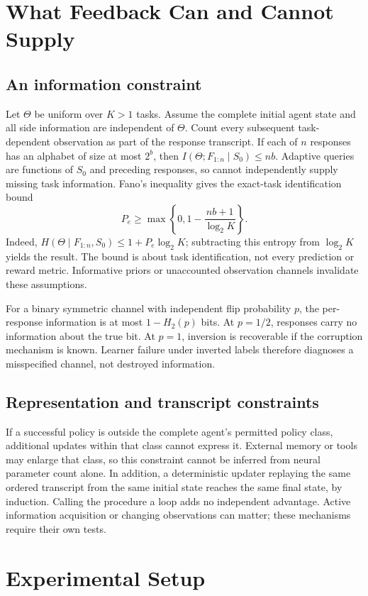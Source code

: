 \documentclass[11pt]{article}
\begin{document}
\section{What Feedback Can and Cannot Supply}
\subsection{An information constraint}
Let $\Theta$ be uniform over $K>1$ tasks. Assume the complete initial agent
state and all side information are independent of $\Theta$. Count every
subsequent task-dependent observation as part of the response transcript.
If each of $n$ responses has an alphabet of size at most $2^b$, then
$I(\Theta;F_{1:n}\mid S_0)\leq nb$. Adaptive queries are functions of
$S_0$ and preceding responses, so cannot independently supply missing task
information. Fano's inequality gives the exact-task identification bound
\[
 P_e\geq \max\left\{0,1-\frac{nb+1}{\log_2 K}\right\}.
\]
Indeed, $H(\Theta\mid F_{1:n},S_0)\leq 1+P_e\log_2 K$; subtracting
this entropy from $\log_2 K$ yields the result. The bound is about task
identification, not every prediction or reward metric. Informative priors or
unaccounted observation channels invalidate these assumptions.

For a binary symmetric channel with independent flip probability $p$, the
per-response information is at most $1-H_2(p)$ bits. At $p=1/2$, responses
carry no information about the true bit. At $p=1$, inversion is recoverable
if the corruption mechanism is known. Learner failure under inverted labels
therefore diagnoses a misspecified channel, not destroyed information.

\subsection{Representation and transcript constraints}
If a successful policy is outside the complete agent's permitted policy class,
additional updates within that class cannot express it. External memory or
tools may enlarge that class, so this constraint cannot be inferred from
neural parameter count alone. In addition, a deterministic updater replaying
the same ordered transcript from the same initial state reaches the same
final state, by induction. Calling the procedure a loop adds no independent
advantage. Active information acquisition or changing observations can matter;
these mechanisms require their own tests.

\section{Experimental Setup}
\end{document}

